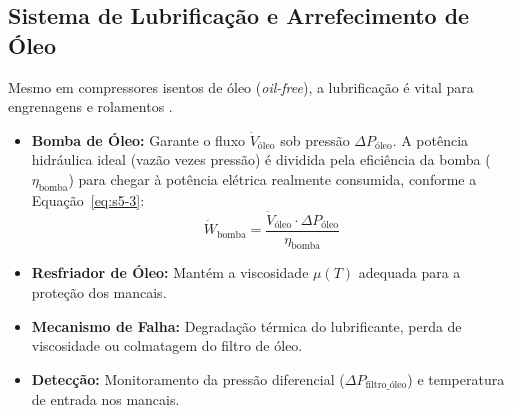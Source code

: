 \documentclass[12pt,a4paper]{article}
\numberwithin{equation}{section}
\numberwithin{table}{section}
\numberwithin{figure}{section}
\begin{document}
	\subsection{\textbf{Sistema de Lubrificação e Arrefecimento de Óleo}}
	Mesmo em compressores isentos de óleo (\textit{oil-free}), a lubrificação é vital para engrenagens e rolamentos \cite{hamrock}.
	\begin{itemize}
		\item \textbf{Bomba de Óleo:} Garante o fluxo $\dot{V}_{\text{óleo}}$ sob pressão $\Delta P_{\text{óleo}}$. A potência hidráulica ideal (vazão vezes pressão) é dividida pela eficiência da bomba ($\eta_{\text{bomba}}$) para chegar à potência elétrica realmente consumida, conforme a Equação~\eqref{eq:s5-3}:
		\begin{equation}\label{eq:s5-3}
 \dot{W}_{\text{bomba}} = \frac{\dot{V}_{\text{óleo}} \cdot \Delta P_{\text{óleo}}}{\eta_{\text{bomba}}}
\end{equation}
		\item \textbf{Resfriador de Óleo:} Mantém a viscosidade $\mu(T)$ adequada para a proteção dos mancais.
		\item \textbf{Mecanismo de Falha:} Degradação térmica do lubrificante, perda de viscosidade ou colmatagem do filtro de óleo.
		\item \textbf{Detecção:} Monitoramento da pressão diferencial ($\Delta P_{\text{filtro\_óleo}}$) e temperatura de entrada nos mancais.
	\end{itemize}
	
\end{document}
